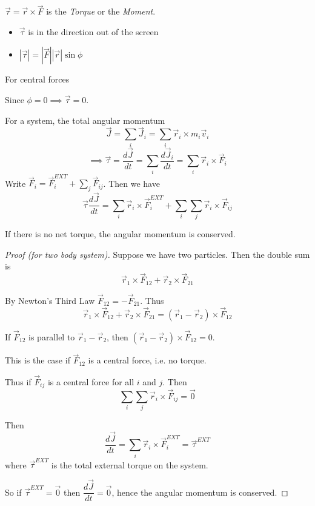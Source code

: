 \documentclass[twoside]{scrartcl}
\begin{document}
\begin{definition}
$\vec{\tau} = \vec{r} \times \vec{F}$ is the \emph{Torque} or the \emph{Moment}. 
\vspace*{50pt}
\begin{itemize}
\item $\vec{\tau}$ is in the direction out of the screen
\item $|\vec{\tau}| = |\vec{F}||\vec{r}|\sin\phi$ 	
\end{itemize}
\end{definition}

For central forces 
\vspace*{50pt}

Since $\phi = 0 \implies \vec{\tau} = 0$. 

For a system, the total angular momentum
\[\vec{J} = \sum_{i}\vec{J}_i = \sum_i\vec{r}_i \times m_i \vec{v}_i\]
\[\implies \vec{\tau} = \frac{d\vec{J}}{dt} = \sum_i\dfrac{d\vec{J}_i}{dt} = \sum_i\vec{r}_i\times\vec{F}_i\]
Write $\vec{F}_i = \vec{F}_i^{EXT} + \sum_j\vec{F}_{ij}$. Then we have
\begin{equation} \vec{\tau} \frac{d\vec{J}}{dt} = \sum_i\vec{r}_i\times\vec{F}_i^{EXT} + \sum_i\sum_j\vec{r}_i\times\vec{F}_{ij}\end{equation}


\begin{theorem}
If there is no net torque, the angular momentum is conserved.
\end{theorem}

\begin{proof}[Proof (for two body system)]

Suppose we have two particles. Then the double sum is 
\[\vec{r}_1 \times\vec{F}_{12} +\vec{r}_2 \times\vec{F}_{21} \]

By Newton's Third Law $\vec{F}_{12} = -\vec{F}_{21}$. Thus
\[\vec{r}_1 \times\vec{F}_{12} +\vec{r}_2 \times\vec{F}_{21} = (\vec{r}_1 - \vec{r}_2) \times \vec{F}_{12}\]

If $\vec{F}_{12}$ is parallel to $\vec{r}_1 - \vec{r}_2$, then $(\vec{r}_1 - \vec{r}_2) \times \vec{F}_{12} = 0$. 

This is the case if $\vec{F}_{12}$ is a central force, i.e. no torque. 

Thus if $\vec{F}_{ij}$ is a central force for all $i$ and $j$. Then 
\[\sum_i\sum_j \vec{r}_i \times \vec{F}_{ij} = \vec{0}\]

Then 
\[\frac{d\vec{J}}{dt} = \sum_i\vec{r}_i \times \vec{F}_i^{EXT} = \vec{\tau}^{EXT}\]
where $\vec{\tau}^{EXT}$ is the total external torque on the system.

So if $\vec{\tau}^{EXT} = \vec{0}$ then $\dfrac{d\vec{J}}{dt} = \vec{0}$, hence the angular momentum is conserved.
\end{proof}
\end{document}
